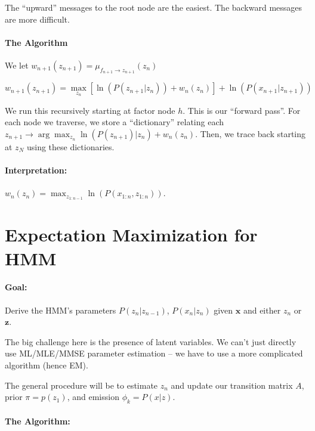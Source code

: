 \documentclass[a4paper,12pt]{report}
\begin{document}
The ``upward'' messages to the root node are the easiest. The backward messages are more difficult.

\paragraph{The Algorithm} 

We let $w_{n+1}(z_{n+1}) = \mu_{f_{n+1} \to z_{n+1}}(z_n)$

\begin{equation}
w_{n+1}(z_{n+1}) = \max_{z_n} [\ln( P(z_{n+1} | z_n)) + w_n(z_n) ] + \ln(P(x_{n+1} | z_{n+1}))
\end{equation}

We run this recursively starting at factor node $h$. This is our ``forward pass''. For each node we traverse, we store a ``dictionary'' relating each $z_{n+1}\to \arg \max_{z_n} \ln(P(z_{n+1}) | z_n) + w_n(z_n)$. Then, we trace back starting at $z_N$ using these dictionaries.

\paragraph{Interpretation: } $w_n(z_n)= \max_{z_{1:n-1}} \ln(P(x_{1:n}, z_{1:n}))$. 





\section{Expectation Maximization for HMM}

\paragraph{Goal: } Derive the HMM's parameters $P(z_n | z_{n-1})$, $P(x_n | z_n)$ given $\pmb x$ and either $z_n$ or $\pmb z$.


The big challenge here is the presence of latent variables. We can't just directly use ML/MLE/MMSE parameter estimation -- we have to use a more complicated algorithm (hence EM).


The general procedure will be to estimate $z_n$ and update our transition matrix $A$, prior $\pi= p(z_1)$, and emission $\phi_k = P(x | z)$.

\paragraph{The Algorithm: } 
\end{document}
